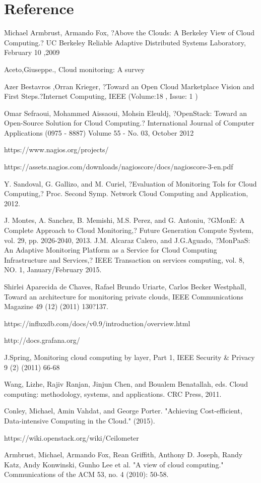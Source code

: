\documentclass[11pt, oneside]{article}   	%
\begin{document}
\section{Reference}


Michael Armbrust, Armando Fox, ?Above the Clouds: A Berkeley View of Cloud Computing.? UC Berkeley Reliable Adaptive Distributed Systems Laboratory, February 10 ,2009

Aceto,Giuseppe.,  Cloud monitoring: A survey

Azer Bestavros ,Orran Krieger, ?Toward an Open Cloud Marketplace Vision and First Steps.?Internet Computing, IEEE  (Volume:18 ,  Issue: 1 )

Omar Sefraoui, Mohammed Aissaoui, Mohsin Eleuldj, ?OpenStack: Toward an Open-Source Solution for Cloud Computing.? International Journal of Computer Applications (0975 - 8887) Volume 55 - No. 03, October 2012

https://www.nagios.org/projects/

https://assets.nagios.com/downloads/nagioscore/docs/nagioscore-3-en.pdf

Y. Sandoval, G. Gallizo, and M. Curiel, ?Evaluation of Monitoring Tols for Cloud Computing,? Proc. Second Symp. Network Cloud Computing and Application, 2012.

J. Montes, A. Sanchez, B. Memishi, M.S. Perez, and G. Antoniu, ?GMonE: A Complete Approach to Cloud Monitoring,? Future Generation Compute System, vol. 29, pp. 2026-2040, 2013.
 J.M. Alcaraz Calero, and J.G.Aguado, ?MonPaaS: An Adaptive Monitoring Platform as a Service for Cloud Computing Infrastructure and Services,? IEEE Transaction on services computing, vol. 8, NO. 1, January/February 2015.

 Shirlei Aparecida de Chaves, Rafael Brundo Uriarte, Carlos Becker Westphall, Toward an architecture for monitoring private clouds, IEEE Communications Magazine 49 (12) (2011) 130?137. 

 https://influxdb.com/docs/v0.9/introduction/overview.html

http://docs.grafana.org/

 J.Spring, Monitoring cloud computing by layer, Part 1, IEEE Security & Privacy 9 (2) (2011) 66-68

Wang, Lizhe, Rajiv Ranjan, Jinjun Chen, and Boualem Benatallah, eds. Cloud computing: methodology, systems, and applications. CRC Press, 2011.

Conley, Michael, Amin Vahdat, and George Porter. "Achieving Cost-efficient, Data-intensive Computing in the Cloud." (2015).

https://wiki.openstack.org/wiki/Ceilometer

Armbrust, Michael, Armando Fox, Rean Griffith, Anthony D. Joseph, Randy Katz, Andy Konwinski, Gunho Lee et al. "A view of cloud computing." Communications of the ACM 53, no. 4 (2010): 50-58.
\end{document}
